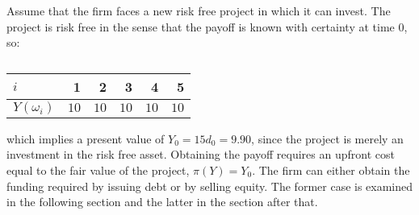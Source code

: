 \documentclass[main.tex]{subfiles}
\begin{document}
    Assume that the firm faces a new risk free project in which it can invest.
    The project is risk free in the sense that the payoff is known with certainty at time 0, so:
        \begin{table}[H]
            \centering
            \begin{tabular}{l|rrrrr}
                $i$ & 1 & 2 & 3 & 4 & 5 \\
                \hline
                $Y(\omega_{i})$ & $10$ & $10$ & $10$ & $10$ & $10$
            \end{tabular}
            \caption{}
        \end{table}
    which implies a present value of $Y_{0} = 15d_{0} = 9.90$, since the project is merely an investment in the risk free asset.
    Obtaining the payoff requires an upfront cost equal to the fair value of the project, $\pi(Y) = Y_{0}$.
    The firm can either obtain the funding required by issuing debt or by selling equity.
    The former case is examined in the following section and the latter in the section after that.
\end{document}
